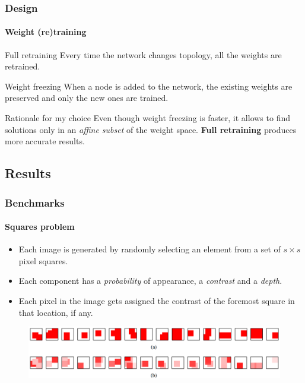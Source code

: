 \documentclass{beamer}
\begin{document}
			\begin{frame}
				\frametitle{Design}
				\framesubtitle{Weight (re)training}
				\begin{block}{Full retraining}
					Every time the network changes topology, all the weights are retrained.
				\end{block}
				\begin{block}{Weight freezing}
					When a node is added to the network, the existing weights are preserved and only the new ones are trained.
				\end{block}
				\begin{exampleblock}{Rationale for my choice}
					Even though weight freezing is faster, it allows to find solutions only in an \emph{affine subset} of the weight space. \textbf{Full retraining} produces more accurate results.
				\end{exampleblock}
			\end{frame}


		\subsection{Results}
			\begin{frame}
				\frametitle{Benchmarks}
				\framesubtitle{Squares problem}
				\begin{itemize}
					\item Each image is generated by randomly selecting an element from a set of $s \times s$ pixel squares.
					\item Each component has a \emph{probability} of appearance, a \emph{contrast} and a \emph{depth}.
					\item Each pixel in the image gets assigned the contrast of the foremost square in that location, if any.
				\end{itemize}
				\begin{figure}[h]
					\centering
					\includegraphics[width=\textwidth]{squares}
				\end{figure}
			\end{frame}
			
\end{document}
